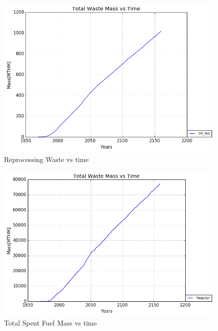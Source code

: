\begin{figure}
	\includegraphics[width=\linewidth]{./images/reprocess/FP_MA_total_Waste.png}
	\caption{Reprocessing Waste vs time}
	\label{fig:reprocess_rep_waste}
\end{figure}

\begin{figure}
	\includegraphics[width=\linewidth]{./images/reprocess/Reactor_total_Waste.png}
	\caption{Total Spent Fuel Mass vs time}
	\label{fig:reprocess_reactor_waste}
\end{figure}


